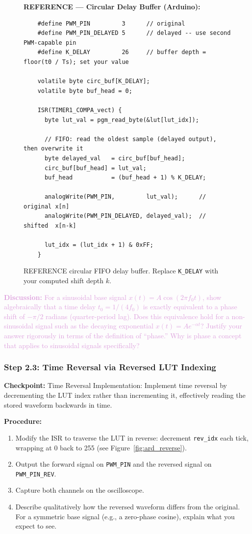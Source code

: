 \documentclass[11pt,letterpaper]{article}
\providecommand{\cpECE}[1]{\textcolor{OliveGreen}{\textbf{Checkpoint:} #1}}
\providecommand{\disECE}[1]{\textcolor{Plum}{\textbf{Discussion:} #1}}
\begin{document}
\begin{figure}[H]
    \centering
    \vspace{0.3in}
    \textbf{REFERENCE --- Circular Delay Buffer (Arduino):}
    \begin{verbatim}
    #define PWM_PIN         3      // original
    #define PWM_PIN_DELAYED 5      // delayed -- use second PWM-capable pin
    #define K_DELAY         26     // buffer depth = floor(t0 / Ts); set your value

    volatile byte circ_buf[K_DELAY];
    volatile byte buf_head = 0;

    ISR(TIMER1_COMPA_vect) {
      byte lut_val = pgm_read_byte(&lut[lut_idx]);

      // FIFO: read the oldest sample (delayed output), then overwrite it
      byte delayed_val   = circ_buf[buf_head];
      circ_buf[buf_head] = lut_val;
      buf_head           = (buf_head + 1) % K_DELAY;

      analogWrite(PWM_PIN,         lut_val);      // original x[n]
      analogWrite(PWM_PIN_DELAYED, delayed_val);  // shifted  x[n-k]

      lut_idx = (lut_idx + 1) & 0xFF;
    }
    \end{verbatim}
    \vspace{0.2in}
    \caption{REFERENCE circular FIFO delay buffer. Replace \texttt{K\_DELAY} with your computed shift depth $k$.}
    \label{fig:ard_delay}
\end{figure}

\disECE{For a sinusoidal base signal $x(t) = A\cos(2\pi f_0 t)$, show algebraically that a time delay $t_0 = 1/(4f_0)$ is exactly equivalent to a phase shift of $-\pi/2$ radians (quarter-period lag). Does this equivalence hold for a non-sinusoidal signal such as the decaying exponential $x(t) = Ae^{-\alpha t}$? Justify your answer rigorously in terms of the definition of ``phase.'' Why is phase a concept that applies to sinusoidal signals specifically?}

\subsubsection{Step 2.3: Time Reversal via Reversed LUT Indexing}
\cpECE{Time Reversal Implementation:} Implement time reversal by decrementing the LUT index rather than incrementing it, effectively reading the stored waveform backwards in time.

\textbf{Procedure:}
\begin{enumerate}
    \item Modify the ISR to traverse the LUT in reverse: decrement \texttt{rev\_idx} each tick, wrapping at 0 back to 255 (see Figure~\ref{fig:ard_reverse}).
    \item Output the forward signal on \texttt{PWM\_PIN} and the reversed signal on \texttt{PWM\_PIN\_REV}.
    \item Capture both channels on the oscilloscope.
    \item Describe qualitatively how the reversed waveform differs from the original. For a symmetric base signal (e.g., a zero-phase cosine), explain what you expect to see.
\end{enumerate}
\end{document}
